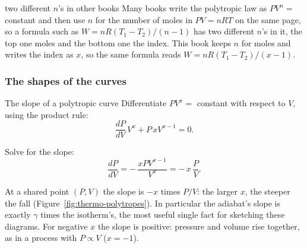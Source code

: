 
\begin{trapbox}{two different $n$'s in other books}
Many books write the polytropic law as $PV^n=$ constant and then use $n$ for the number of moles in
$PV=nRT$ on the same page, so a formula such as $W=nR(T_1-T_2)/(n-1)$ has two different $n$'s in it,
the top one moles and the bottom one the index. This book keeps $n$ for moles and writes the index as
$x$, so the same formula reads $W=nR(T_1-T_2)/(x-1)$.
\end{trapbox}

\subsubsection{The shapes of the curves}

\begin{figure}[htbp]
\centering
{}
\end{figure}

\begin{derivbox}{The slope of a polytropic curve}\label{der:polyslope}
 Differentiate $PV^x=$ constant with respect to $V$, using the product rule:
\[ \frac{dP}{dV}\,V^x+P\,xV^{x-1}=0 . \]

 Solve for the slope:
\[ \frac{dP}{dV}=-\,\frac{xPV^{x-1}}{V^x}=-\,x\,\frac{P}{V} . \]

 At a shared point $(P,V)$ the slope is $-x$ times $P/V$: the larger $x$, the steeper the fall
(Figure~\ref{fig:thermo-polytropes}). In particular the adiabat's slope is exactly $\gamma$ times the
isotherm's, the most useful single fact for sketching these diagrams. For negative $x$ the slope is
positive: pressure and volume rise together, as in a process with $P\propto V$ ($x=-1$).
\end{derivbox}

